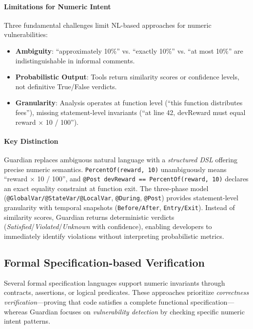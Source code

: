 \documentclass[pdflatex,sn-basic]{sn-jnl}%
\theoremstyle{thmstyleone}%
\theoremstyle{thmstyletwo}%
\theoremstyle{thmstylethree}%
\begin{document}
\paragraph{Limitations for Numeric Intent}
Three fundamental challenges limit NL-based approaches for numeric vulnerabilities:
\begin{itemize}
    \item \textbf{Ambiguity}: ``approximately 10\%'' vs. ``exactly 10\%'' vs. ``at most 10\%'' are indistinguishable in informal comments.
    \item \textbf{Probabilistic Output}: Tools return similarity scores or confidence levels, not definitive True/False verdicts.
    \item \textbf{Granularity}: Analysis operates at function level (``this function distributes fees''), missing statement-level invariants (``at line 42, devReward must equal reward $\times$ 10 / 100'').
\end{itemize}

\paragraph{Key Distinction}
Guardian replaces ambiguous natural language with a \textit{structured DSL} offering precise numeric semantics. \texttt{PercentOf(reward, 10)} unambiguously means ``reward $\times$ 10 / 100'', and \texttt{@Post devReward == PercentOf(reward, 10)} declares an exact equality constraint at function exit. The three-phase model (\texttt{@GlobalVar/@StateVar/@LocalVar}, \texttt{@During}, \texttt{@Post}) provides statement-level granularity with temporal snapshots (\texttt{Before/After}, \texttt{Entry/Exit}). Instead of similarity scores, Guardian returns deterministic verdicts (\textit{Satisfied}/\textit{Violated}/\textit{Unknown} with confidence), enabling developers to immediately identify violations without interpreting probabilistic metrics.


\subsection{Formal Specification-based Verification}

Several formal specification languages support numeric invariants through contracts, assertions, or logical predicates. These approaches prioritize \textit{correctness verification}—proving that code satisfies a complete functional specification—whereas Guardian focuses on \textit{vulnerability detection} by checking specific numeric intent patterns.
\end{document}
